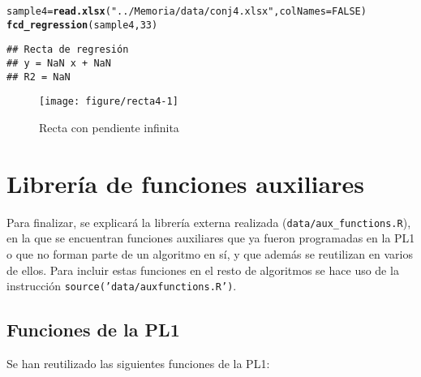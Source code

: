 \documentclass[12pt]{report}\usepackage[]{graphicx}\usepackage[dvipsnames]{xcolor}
\makeatletter
\def\maxwidth{ %
  \ifdim\Gin@nat@width>\linewidth
    \linewidth
  \else
    \Gin@nat@width
  \fi
}
\newcommand{\hlnum}[1]{\textcolor[rgb]{0.686,0.059,0.569}{#1}}%
\newcommand{\hlstr}[1]{\textcolor[rgb]{0.192,0.494,0.8}{#1}}%
\newcommand{\hlstd}[1]{\textcolor[rgb]{0.345,0.345,0.345}{#1}}%
\newcommand{\hlkwb}[1]{\textcolor[rgb]{0.69,0.353,0.396}{#1}}%
\newcommand{\hlkwc}[1]{\textcolor[rgb]{0.333,0.667,0.333}{#1}}%
\newcommand{\hlkwd}[1]{\textcolor[rgb]{0.737,0.353,0.396}{\textbf{#1}}}%
\newenvironment{kframe}{%
 \def\at@end@of@kframe{}%
 \ifinner\ifhmode%
  \def\at@end@of@kframe{\end{minipage}}%
  \begin{minipage}{\columnwidth}%
 \fi\fi%
 \def\FrameCommand##1{\hskip\@totalleftmargin \hskip-\fboxsep
 \colorbox{shadecolor}{##1}\hskip-\fboxsep
     \hskip-\linewidth \hskip-\@totalleftmargin \hskip\columnwidth}%
 \MakeFramed {\advance\hsize-\width
   \@totalleftmargin\z@ \linewidth\hsize
   \@setminipage}}%
 {\par\unskip\endMakeFramed%
 \at@end@of@kframe}
\newenvironment{knitrout}{}{} %
\makeatother
\begin{document}
\begin{knitrout}
\color{fgcolor}\begin{kframe}
\begin{alltt}
\hlstd{sample4} \hlkwb{=} \hlkwd{read.xlsx}\hlstd{(}\hlstr{"../Memoria/data/conj4.xlsx"}\hlstd{,} \hlkwc{colNames}\hlstd{=}\hlnum{FALSE}\hlstd{)}
\hlkwd{fcd_regression}\hlstd{(sample4,} \hlnum{33}\hlstd{)}
\end{alltt}
\begin{verbatim}
## Recta de regresión
## y = NaN x + NaN 
## R2 = NaN
\end{verbatim}


{\ttfamily\noindent\bfseries\color{errorcolor}{\#\# Error in int\_abline(a = a, b = b, h = h, v = v, untf = untf, ...): 'a' y 'b' deben ser finitos}}\end{kframe}\begin{figure}[H]

{\centering \texttt{[image: figure/recta4-1]} 

}

\caption[Recta con pendiente infinita]{Recta con pendiente infinita}\label{fig:recta4}
\end{figure}

\end{knitrout}
 				
 	\appendix
 	\chapter{Librería de funciones auxiliares}\label{ap:Libreria}
 	
	 	Para finalizar, se explicará la librería externa realizada (\texttt{data/aux\_functions.R}), en la que se encuentran funciones auxiliares que ya fueron programadas en la PL1 o que no forman parte de un algoritmo en sí, y que además se reutilizan en varios de ellos. Para incluir estas funciones en el resto de algoritmos se hace uso de la instrucción \texttt{source('data/auxfunctions.R')}. 
	 	
	 	\section{Funciones de la PL1}
	 	
		 	\noindent Se han reutilizado las siguientes funciones de la PL1:
		 	
\end{document}
